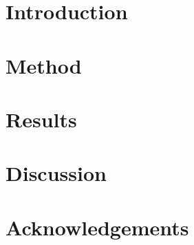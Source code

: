 \documentclass[twocolumn]{aastex631}
\begin{document}
\section{Introduction}



\section{Method}



\section{Results}



\section{Discussion}



\section{Acknowledgements}




\end{document}

